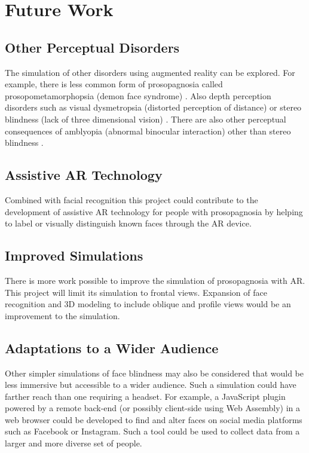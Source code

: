\documentclass{article}
\begin{document}
    \section{Future Work}
    
    \subsection{Other Perceptual Disorders}
    The simulation of other disorders using augmented reality can be explored. For example, there is less common form of prosopagnosia called prosopometamorphopsia (demon face syndrome) \cite{herald_2023}. Also depth perception disorders such as visual dysmetropsia (distorted perception of distance) \cite{lanska_2017} or stereo blindness (lack of three dimensional vision) \cite{richards_1970}. There are also other perceptual consequences of amblyopia (abnormal binocular interaction)  other than stereo blindness \cite{vonnoorden_2001}.

    \subsection{Assistive AR Technology}
    Combined with facial recognition this project could contribute to the development of assistive AR technology for people with prosopagnosia by helping to label or visually distinguish known faces through the AR device.

    \subsection{Improved Simulations}
    There is more work possible to improve the simulation of prosopagnosia with AR. This project will limit its simulation to frontal views. Expansion of face recognition and 3D modeling to include oblique and profile views would be an improvement to the simulation.

    \subsection{Adaptations to a Wider Audience}
    Other simpler simulations of face blindness may also be considered that would be less immersive but accessible to a wider audience. Such a simulation could have farther reach than one requiring a headset. For example, a JavaScript plugin powered by a remote back-end (or possibly client-side using Web Assembly) in a web browser could be developed to find and alter faces on social media platforms such as Facebook or Instagram. Such a tool could be used to collect data from a larger and more diverse set of people.
    
    \printbibliography
\end{document}
